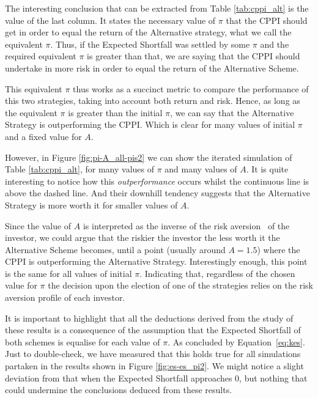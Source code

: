 The interesting conclusion that can be extracted from Table \ref{tab:cppi_alt} is the value of the last column. It states the necessary value of $\pi$ that the CPPI should get in order to equal the return of the Alternative strategy, what we call the equivalent $\pi$. Thus, if the Expected Shortfall was settled by some $\pi$ and the required equivalent $\pi$ is greater than that, we are saying that the CPPI should undertake in more risk in order to equal the return of the Alternative Scheme.

This equivalent $\pi$ thus works as a succinct metric to compare the performance of this two strategies, taking into account both return and risk. Hence, as long as the equivalent $\pi$ is greater than the initial $\pi$, we can say that the Alternative Strategy is outperforming the CPPI. Which is clear for many values of initial $\pi$ and a fixed value for $A$.

However, in Figure \ref{fig:pi-A_all-pis2} we can show the iterated simulation of Table \ref{tab:cppi_alt}, for many values of $\pi$ and many values of $A$. It is quite interesting to notice how this \emph{outperformance} occurs whilst the continuous line is above the dashed line. And their downhill tendency suggests that the Alternative Strategy is more worth it for smaller values of $A$.

Since the value of $A$ is interpreted as the inverse of the risk aversion~\cite{a:guillen-optimisation} of the investor, we could argue that the riskier the investor the less worth it the Alternative Scheme becomes, until a point (usually around $A = 1.5$) where the CPPI is outperforming the Alternative Strategy. Interestingly enough, this point is the same for all values of initial $\pi$. Indicating that, regardless of the chosen value for $\pi$ the decision upon the election of one of the strategies relies on the risk aversion profile of each investor.



It is important to highlight that all the deductions derived from the study of these results is a consequence of the assumption that the Expected Shortfall of both schemes is equalise for each value of $\pi$. As concluded by Equation~\ref{eq:kes}. Just to double-check, we have measured that this holds true for all simulations partaken in the results shown in Figure \ref{fig:es-es_pi2}. We might notice a slight deviation from that when the Expected Shortfall approaches $0$, but nothing that could undermine the conclusions deduced from these results.


